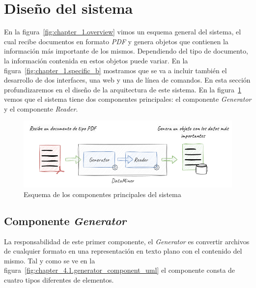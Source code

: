 \section{Diseño del sistema}\label{sec:diseno_del_sistema}

En la figura~\ref{fig:chapter_1.overview} vimos un esquema general del sistema, el cual recibe documentos en formato
\textit{PDF} y genera objetos que contienen la información más importante de los mismos.
Dependiendo del tipo de documento, la información contenida en estos objetos puede variar.
En la figura~\ref{fig:chapter_1.specific_b} mostramos que se va a incluir también el desarrollo de dos interfaces, una
web y una de línea de comandos.
En esta sección profundizaremos en el diseño de la arquitectura de este sistema.
En la figura~\ref{fig:chapter_4.1.overview} vemos que el sistema tiene dos componentes principales: el componente
\textit{Generator} y el componente \textit{Reader}.

\begin{figure}[ht]
    \begin{center}
        \includegraphics[width=\textwidth]{./chapter/4/images/chapter_4.1.overview}
        \caption{Esquema de los componentes principales del sistema}
        \label{fig:chapter_4.1.overview}
    \end{center}
\end{figure}

\subsection*{Componente \textit{Generator}}\label{subsec:chapter_4.generator_component}

La responsabilidad de este primer componente, el \textit{Generator} es convertir archivos de cualquier formato en una
representación en texto plano con el contenido del mismo.
Tal y como se ve en la figura~\ref{fig:chapter_4.1.generator_component_uml} el componente consta de cuatro tipos
diferentes de elementos.


